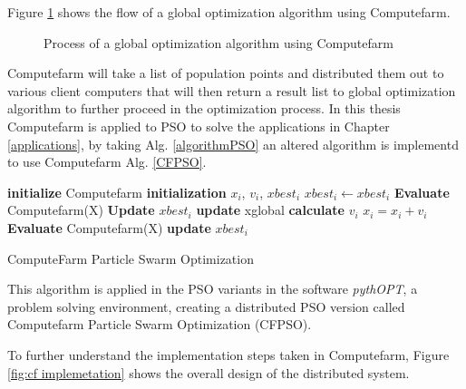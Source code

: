     Figure \ref{fig:computefarm} shows the flow of a global optimization algorithm using Computefarm. 

\begin{figure}[!h]
    \centering
    
    \caption{Process of a global optimization algorithm using Computefarm}
    \label{fig:computefarm}
\end{figure}

Computefarm will take a list of population points and distributed them out to various client computers that will then return a result list to global optimization algorithm to further proceed in the optimization process. In this thesis Computefarm is applied to PSO to solve the applications in Chapter \ref{applications}, by taking Alg. \ref{algorithmPSO} an altered algorithm is implementd to use Computefarm Alg. \ref{CFPSO}.
\begin{algorithm}[H]
  \begin{algorithmic}[2]

      \State \textbf{initialize} Computefarm 
        \State \textbf{initialization} $x_i$, $v_i$, $xbest_i$ 
        $xbest_i \gets xbest_i$
    \EndFor
    \State \textbf{Evaluate} Computefarm(X) 
        \State \textbf{Update} $xbest_i$ 
    \EndFor
            \State \textbf{update} xglobal 
            \State \textbf{calculate} $v_i$ 
            \State $x_i = x_i + v_i$
        \EndFor
        \State \textbf{Evaluate} Computefarm(X)
            \State \textbf{update} $xbest_i$
        \EndFor
    \EndWhile
  \end{algorithmic}
\caption{ComputeFarm Particle Swarm Optimization}
\label{CFPSO}
\end{algorithm}
 
This algorithm is applied in the PSO variants in the software \textit{pythOPT}, a problem solving environment, creating a distributed PSO version called Computefarm Particle Swarm Optimization (CFPSO).

To further understand the implementation steps taken in Computefarm, Figure \ref{fig:cf implemetation} shows the overall design of the distributed system. 

